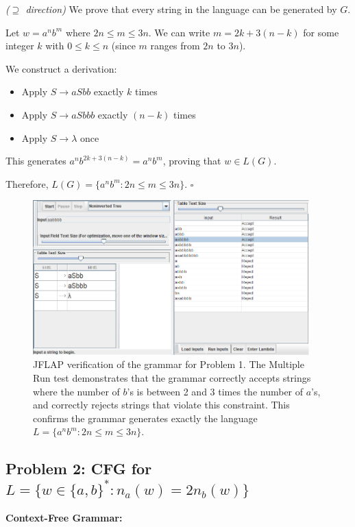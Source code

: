\documentclass[12pt]{article}
\begin{document}
\textit{($\supseteq$ direction)} We prove that every string in the language can be generated by $G$.

Let $w = a^n b^m$ where $2n \le m \le 3n$. We can write $m = 2k + 3(n-k)$ for some integer $k$ with $0 \le k \le n$ (since $m$ ranges from $2n$ to $3n$).

We construct a derivation:
\begin{itemize}
\item Apply $S \rightarrow aSbb$ exactly $k$ times
\item Apply $S \rightarrow aSbbb$ exactly $(n-k)$ times
\item Apply $S \rightarrow \lambda$ once
\end{itemize}

This generates $a^n b^{2k + 3(n-k)} = a^n b^m$, proving that $w \in L(G)$.

Therefore, $L(G) = \{a^n b^m : 2n \le m \le 3n\}$. $\square$

\begin{figure}[H]
\centering
\includegraphics[width=0.95\textwidth]{Problem 1/Problem 1.png}
\caption{JFLAP verification of the grammar for Problem 1. The Multiple Run test demonstrates that the grammar correctly accepts strings where the number of $b$'s is between 2 and 3 times the number of $a$'s, and correctly rejects strings that violate this constraint. This confirms the grammar generates exactly the language $L = \{a^n b^m : 2n \le m \le 3n\}$.}
\label{fig:problem1}
\end{figure}

\subsection{Problem 2: CFG for $L = \{w \in \{a,b\}^* : n_a(w) = 2n_b(w)\}$}

\textbf{Context-Free Grammar:}
\end{document}
